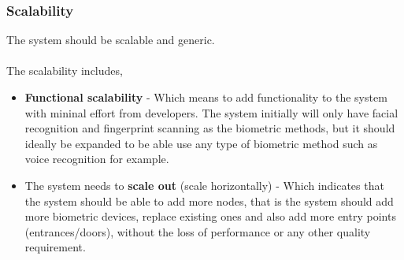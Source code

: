 \subsubsection{Scalability}
The system should be scalable and generic.\\
\\The scalability includes,
\begin{itemize}
	\item  \textbf{Functional scalability} - Which means to add functionality to the system with mininal effort from developers.
		The system initially will only have facial recognition and fingerprint scanning as the biometric methods, but it should ideally be expanded to be able use any type of biometric method such as voice recognition for example.
	\item  The system needs to \textbf{scale out} (scale horizontally) - Which indicates that the system should be able to add more nodes, that 		is the system should add more biometric devices, replace existing ones and also add more entry points (entrances/doors), 			without the loss of performance or any other quality requirement.
\end{itemize}





